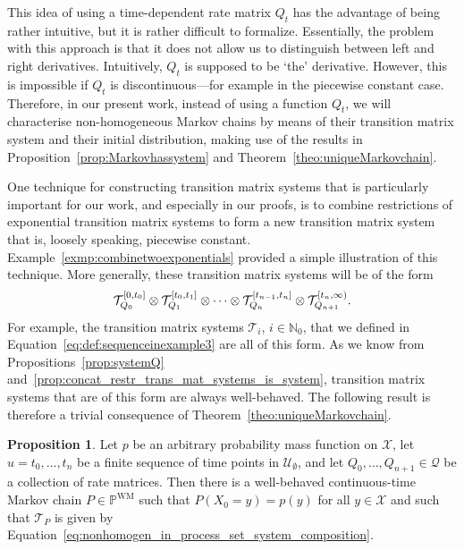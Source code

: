 \documentclass[10pt,a4paper]{paper}
\theoremstyle{definition}
\newtheorem{proposition}[theorem]{Proposition}
\newcommand{\nats}{\mathbb{N}}
\newcommand{\states}{\mathcal{X}}
\newcommand{\processes}{\mathbb{P}}
\newcommand{\wmprocesses}{\processes^{\mathrm{WM}}}
\newcommand{\rateset}{\mathcal{Q}}
\begin{document}
This idea of using a time-dependent rate matrix $Q_t$ has the advantage of being rather intuitive, but it is rather difficult to formalize. Essentially, the problem with this approach is that it does not allow us to distinguish between left and right derivatives. Intuitively, $Q_t$ is supposed to be `the' derivative. However, this is impossible if $Q_t$ is discontinuous---for example in the piecewise constant case. Therefore, in our present work, instead of using a function $Q_t$, we will characterise non-homogeneous Markov chains by means of their transition matrix system and their initial distribution, making use of the results in Proposition~\ref{prop:Markovhassystem} and Theorem~\ref{theo:uniqueMarkovchain}.

One technique for constructing transition matrix systems that is particularly important for our work, and especially in our proofs, is to combine restrictions of exponential transition matrix systems to form a new transition matrix system that is, loosely speaking, piecewise constant. Example~\ref{exmp:combinetwoexponentials} provided a simple illustration of this technique. More generally, these transition matrix systems will be of the form
\begin{equation}\label{eq:nonhomogen_in_process_set_system_composition}%
\mathcal{T}_{Q_0}^{[0,t_0]}\otimes \mathcal{T}_{Q_1}^{[t_0,t_1]} \otimes \cdots \otimes \mathcal{T}_{Q_n}^{[t_{n-1},t_n]} \otimes \mathcal{T}_{Q_{n+1}}^{[t_n,\infty)}.
\vspace{4pt}
\end{equation}
For example, the transition matrix systems $\mathcal{T}_i$, $i\in\nats_0$, that we defined in Equation~\eqref{eq:def:sequenceinexample3} are all of this form.
As we know from Propositions~\ref{prop:systemQ} and~\ref{prop:concat_restr_trans_mat_systems_is_system}, transition matrix systems that are of this form are always well-behaved. The following result is therefore a trivial consequence of Theorem~\ref{theo:uniqueMarkovchain}.

\begin{proposition}\label{prop:finite_different_rate_matrix_has_process}
Let $p$ be an arbitrary probability mass function on $\states$, let $u=t_0,\ldots,t_n$ be a finite sequence of time points in $\mathcal{U}_\emptyset$, and let $Q_0,\ldots,Q_{n+1}\in\rateset$ be a collection of rate matrices. Then there is a well-behaved continuous-time Markov chain $P\in\wmprocesses$ such that $P(X_0=y)=p(y)$ for all $y\in\mathcal{X}$ and such that $\mathcal{T}_P$ is given by Equation~\eqref{eq:nonhomogen_in_process_set_system_composition}.
\end{proposition}
\end{document}
